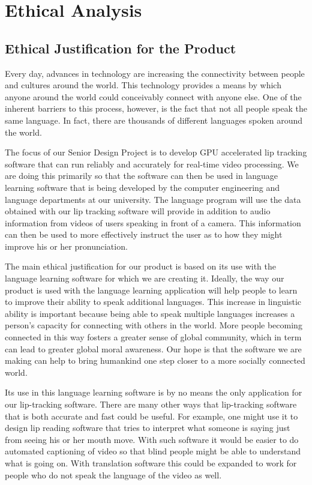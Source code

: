 \ifethics
\else
\chapter{Ethical Analysis}
\fi

\section{Ethical Justification for the Product}
Every day, advances in technology are increasing the connectivity between people and cultures around the world. This technology provides a means by which anyone around the world could conceivably connect with anyone else. One of the inherent barriers to this process, however, is the fact that not all people speak the same language. In fact, there are thousands of different languages spoken around the world. 

\ifethics
The focus of our Senior Design Project is to develop GPU accelerated lip tracking software that can run reliably and accurately for real-time video processing. We are doing this primarily so that the software can then be used in language learning software that is being developed by the computer engineering and language departments at our university. The language program will use the data obtained with our lip tracking software will provide in addition to audio information from videos of users speaking in front of a camera. This information can then be used to more effectively instruct the user as to how they might improve his or her pronunciation.
\fi

The main ethical justification for our product is based on its use with the language learning software for which we are creating it. Ideally, the way our product is used with the language learning application will help people to learn to improve their ability to speak additional languages. This increase in linguistic ability is important because being able to speak multiple languages increases a person's capacity for connecting with others in the world. More people becoming connected in this way fosters a greater sense of global community, which in term can lead to greater global moral awareness. Our hope is that the software we are making can help to bring humankind one step closer to a more socially connected world.

Its use in this language learning software is by no means the only application for our lip-tracking software. There are many other ways that lip-tracking software that is both accurate and fast could be useful. For example, one might use it to design lip reading software that tries to interpret what someone is saying just from seeing his or her mouth move. With such software it would be easier to do automated captioning of video so that blind people might be able to understand what is going on. With translation software this could be expanded to work for  people who do not speak the language of the video as well.


